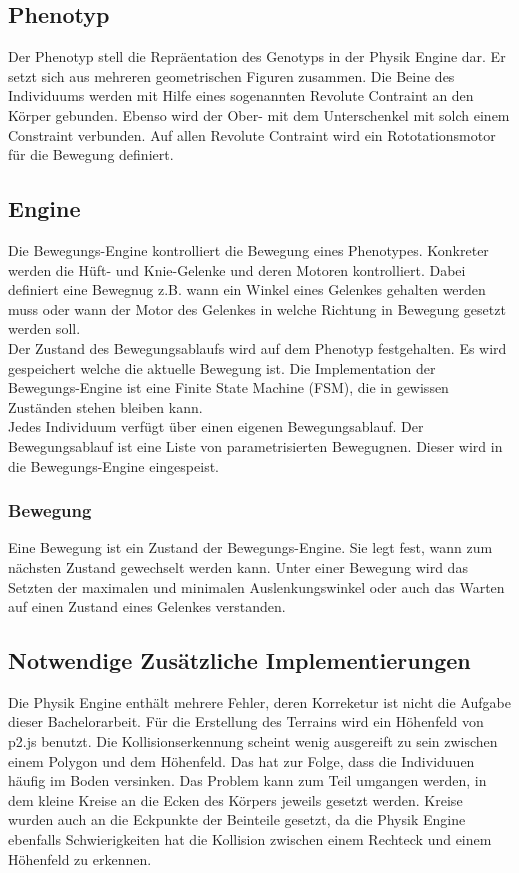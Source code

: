   \subsection{Phenotyp\label{sub:Phenotyp}}
    Der Phenotyp stell die Repräentation des Genotyps in der Physik Engine dar.
    Er setzt sich aus mehreren geometrischen Figuren zusammen. Die Beine des Individuums
    werden mit Hilfe eines sogenannten Revolute Contraint an den Körper gebunden.
    Ebenso wird der Ober- mit dem Unterschenkel mit solch einem Constraint verbunden.
    Auf allen Revolute Contraint wird ein Rototationsmotor für die Bewegung definiert.

  \subsection{Engine\label{sub:Engine}}

    Die Bewegungs-Engine kontrolliert die Bewegung eines Phenotypes.
    Konkreter werden die Hüft- und Knie-Gelenke und deren Motoren kontrolliert.
    Dabei definiert eine Bewegnug z.B. wann ein Winkel eines Gelenkes gehalten werden muss
    oder wann der Motor des Gelenkes in welche Richtung in Bewegung gesetzt werden soll.
    \\
    Der Zustand des Bewegungsablaufs wird auf dem Phenotyp festgehalten.
    Es wird gespeichert welche die aktuelle Bewegung ist.
    Die Implementation der Bewegungs-Engine ist eine Finite State Machine (FSM),
    die in gewissen Zuständen stehen bleiben kann.
    \\
    Jedes Individuum verfügt über einen eigenen Bewegungsablauf.
    Der Bewegungsablauf ist eine Liste von parametrisierten Bewegugnen.
    Dieser wird in die Bewegungs-Engine eingespeist.

    \subsubsection{Bewegung\label{subsub:EngineMovement}}

      Eine Bewegung ist ein Zustand der Bewegungs-Engine.
      Sie legt fest, wann zum nächsten Zustand gewechselt werden kann.
      Unter einer Bewegung wird das Setzten der maximalen und minimalen Auslenkungswinkel oder auch
      das Warten auf einen Zustand eines Gelenkes verstanden.
  \subsection{Notwendige Zusätzliche Implementierungen}
    Die Physik Engine enthält mehrere Fehler, deren Korreketur ist nicht die Aufgabe dieser Bachelorarbeit.
    Für die Erstellung des Terrains wird ein Höhenfeld von p2.js benutzt. Die Kollisionserkennung scheint wenig ausgereift zu sein
    zwischen einem Polygon und dem Höhenfeld. Das hat zur Folge, dass die Individuuen häufig im Boden versinken. Das Problem kann
    zum Teil umgangen werden, in dem kleine Kreise an die Ecken des Körpers jeweils gesetzt werden.
    Kreise wurden auch an die Eckpunkte der Beinteile gesetzt, da die Physik Engine ebenfalls Schwierigkeiten hat die Kollision zwischen einem
    Rechteck und einem Höhenfeld zu erkennen.

